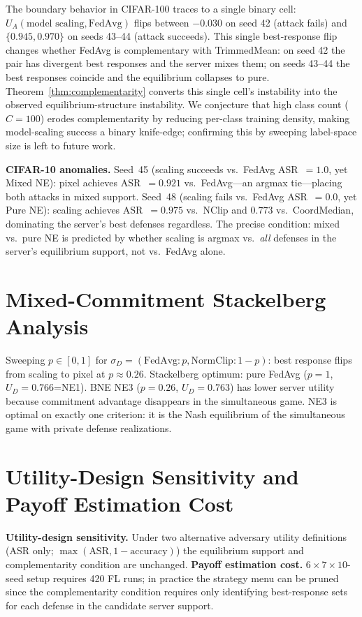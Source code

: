 \documentclass{article}
\newcommand{\UA}{U_A}
\begin{document}
The boundary behavior in CIFAR-100 traces to a single binary cell: $\UA(\text{model scaling}, \text{FedAvg})$ flips between $-0.030$ on seed 42 (attack fails) and $\{0.945, 0.970\}$ on seeds 43--44 (attack succeeds). This single best-response flip changes whether FedAvg is complementary with TrimmedMean: on seed 42 the pair has divergent best responses and the server mixes them; on seeds 43--44 the best responses coincide and the equilibrium collapses to pure. Theorem~\ref{thm:complementarity} converts this single cell's instability into the observed equilibrium-structure instability. We conjecture that high class count ($C=100$) erodes complementarity by reducing per-class training density, making model-scaling success a binary knife-edge; confirming this by sweeping label-space size is left to future work.

\textbf{CIFAR-10 anomalies.} Seed~45 (scaling succeeds vs.\ FedAvg ASR~$=1.0$, yet Mixed NE): pixel achieves ASR~$=0.921$ vs.\ FedAvg---an argmax tie---placing both attacks in mixed support. Seed~48 (scaling fails vs.\ FedAvg ASR~$=0.0$, yet Pure NE): scaling achieves ASR~$=0.975$ vs.\ NClip and $0.773$ vs.\ CoordMedian, dominating the server's best defenses regardless. The precise condition: mixed vs.\ pure NE is predicted by whether scaling is argmax vs.\ \emph{all} defenses in the server's equilibrium support, not vs.\ FedAvg alone.

\section{Mixed-Commitment Stackelberg Analysis}
\label{app:stackelberg}

Sweeping $p \in [0,1]$ for $\sigma_D = (\text{FedAvg}: p, \text{NormClip}: 1-p)$: best response flips from scaling to pixel at $p \approx 0.26$. Stackelberg optimum: pure FedAvg ($p=1$, $U_D=0.766$=NE1). BNE NE3 ($p=0.26$, $U_D=0.763$) has lower server utility because commitment advantage disappears in the simultaneous game. NE3 is optimal on exactly one criterion: it is the Nash equilibrium of the simultaneous game with private defense realizations.

\section{Utility-Design Sensitivity and Payoff Estimation Cost}
\label{app:utility_sensitivity}

\textbf{Utility-design sensitivity.} Under two alternative adversary utility definitions (ASR only; $\max(\text{ASR}, 1-\text{accuracy})$) the equilibrium support and complementarity condition are unchanged. \textbf{Payoff estimation cost.} $6\times7\times10$-seed setup requires 420 FL runs; in practice the strategy menu can be pruned since the complementarity condition requires only identifying best-response sets for each defense in the candidate server support.
\end{document}
